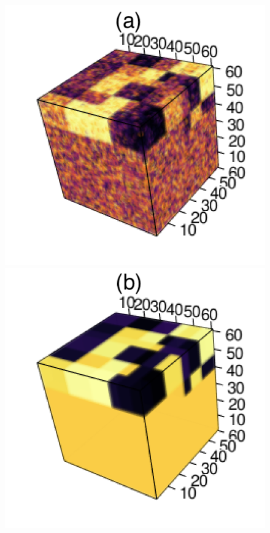 \documentclass{article}
\begin{document}
\begin{figure}
	\centering
	\includegraphics[scale=0.5]{figures/figure2/input.png}
	\includegraphics[scale=0.5]{figures/figure2/truth.png}

\end{figure}
\end{document}
